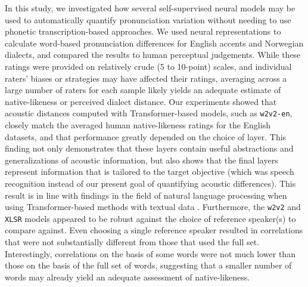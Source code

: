 \documentclass[11pt,a4paper]{article}
\begin{document}

In this study, we investigated how several self-supervised neural models may be used to automatically quantify pronunciation variation without needing to use phonetic transcription-based approaches.
We used neural representations to calculate word-based pronunciation differences for English accents and Norwegian dialects, and compared the results to human perceptual judgements. While these ratings were provided on relatively crude (5 to 10-point) scales, and individual raters' biases or strategies may have affected their ratings, averaging across a large number of raters for each sample likely yields an adequate estimate of native-likeness or perceived dialect distance. Our experiments showed that acoustic distances computed with Transformer-based models, such as \texttt{w2v2-en}, closely match the averaged human native-likeness ratings for the English datasets, and that performance greatly depended on the choice of layer. This finding not only demonstrates that these layers contain useful abstractions and generalizations of acoustic information, but also shows that the final layers represent information that is tailored to the target objective (which was speech recognition instead of our present goal of quantifying acoustic differences). This result is in line with findings in the field of natural language processing when using Transformer-based methods with textual data \citep{tenneyBERTRediscoversClassical2019, devriesWhatSpecialBERT2020}. Furthermore, the \texttt{w2v2} and \texttt{XLSR} models appeared to be robust against the choice of reference speaker(s) to compare against. Even choosing a single reference speaker resulted in correlations that were not substantially different from those that used the full set. Interestingly, correlations on the basis of some words were not much lower than those on the basis of the full set of words, suggesting that a smaller number of words may already yield an adequate assessment of native-likeness. 
\end{document}
